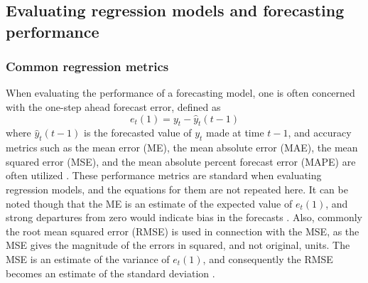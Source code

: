 



 
\subsection{Evaluating regression models and forecasting performance}
\label{sec:reg_metrics}
\subsubsection{Common regression metrics}
When evaluating the performance of a forecasting model, one is often concerned with the one-step ahead forecast error, defined as
$$e_t(1) = y_t - \hat{y}_t (t-1)$$ 
where $\hat{y}_t (t-1)$ is the forecasted value of $y_t$ made at time $t-1$, and accuracy metrics such as the mean error (ME), the mean absolute error (MAE), the mean squared error (MSE), and the mean absolute percent forecast error (MAPE) are often utilized \cite{Montgomery2015}. These performance metrics are standard when evaluating regression models, and the equations for them are not repeated here. It can be noted though that the ME is an estimate of the expected value of $e_t(1)$, and strong departures from zero would indicate bias in the forecasts \cite{Montgomery2015}. Also, commonly the root mean squared error (RMSE) is used in connection with the MSE, as the MSE gives the magnitude of the errors in squared, and not original, units. The MSE is an estimate of the variance of $e_t(1)$, and consequently the RMSE becomes an estimate of the standard deviation \cite{Montgomery2012}. 

